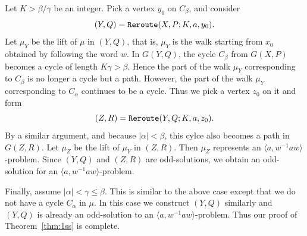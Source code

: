 \documentclass[10pt,a4paper]{amsart}
\theoremstyle{definition}
\theoremstyle{definition}
\numberwithin{equation}{section}
\begin{document}
Let $K>\beta/\gamma$ be an integer. Pick a vertex $y_0$ on $C_\beta$, and consider
$$ (Y, Q)=\mbox{\tt Reroute}(X, P; K, a, y_0). $$
Let $\mu_Y$ be the lift of $\mu$ in $(Y, Q)$, that is, $\mu_Y$ is the walk starting from $x_0$ obtained by following the word $w$. In $G(Y, Q)$, the cycle $C_\beta$ from $G(X, P)$ becomes a cycle of length $K\gamma>\beta$. Hence the part of the walk $\mu_Y$ corresponding to $C_\beta$ is no longer a cycle but a path. However, the part of the walk $\mu_Y$ corresponding to $C_\alpha$ continues to be a cycle. Thus we pick a vertex $z_0$ on it and form
$$ (Z, R)=\mbox{\tt Reroute}(Y, Q; K, a, z_0). $$
By a similar argument, and because $|\alpha|<\beta$, this cylce also becomes a path in $G(Z, R)$. Let $\mu_Z$ be the lift of $\mu_Y$ in $(Z, R)$. Then $\mu_Z$ represents an $\langle a, w^{-1}aw\rangle$-problem. Since $(Y, Q)$ and $(Z, R)$ are odd-solutions, we obtain an odd-solution for an $\langle a, w^{-1}aw\rangle$-problem. 

Finally, assume $|\alpha|<\gamma\leq \beta$. This is similar to the above case except that we do not have a cycle $C_\alpha$ in $\mu$. In this case we construct $(Y, Q)$ similarly and $(Y, Q)$ is already an odd-solution to an $\langle a, w^{-1}aw\rangle$-problem. Thus our proof of Theorem~\ref{thm:1ss} is complete.
\end{document}
